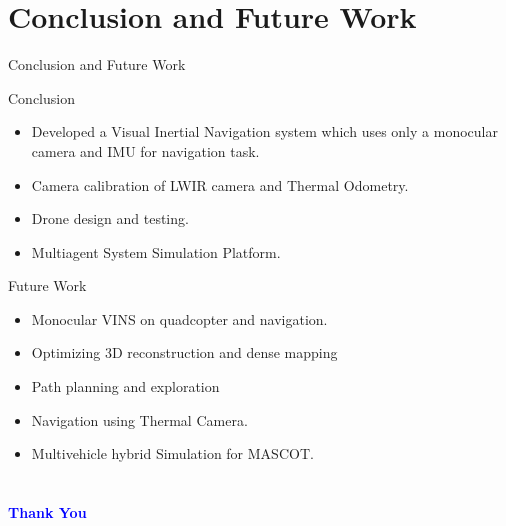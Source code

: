 \documentclass[10pt]{beamer}
\begin{document}
\section{Conclusion and Future Work}
\begin{frame}{Conclusion and Future Work}
    \begin{block}{Conclusion}
        \begin{itemize}
            \item Developed a Visual Inertial Navigation system which uses only a monocular camera and IMU for navigation task.
            \item Camera calibration of LWIR camera and Thermal Odometry. 
            \item Drone design and testing.
            \item Multiagent System Simulation Platform.
        \end{itemize}
    \end{block}

    \pause \begin{block}{Future Work}
        \begin{itemize}
            \item Monocular VINS on quadcopter and navigation.
            \item Optimizing 3D reconstruction and dense mapping
            \item Path planning and exploration
            \item Navigation using Thermal Camera.
            \item Multivehicle hybrid Simulation for MASCOT.
        \end{itemize}
    \end{block}
\end{frame}



\section*{}
\begin{frame}{}
    \Huge{\centerline{\textcolor{blue}{\textbf{Thank You}}}}
\end{frame}
\end{document}
